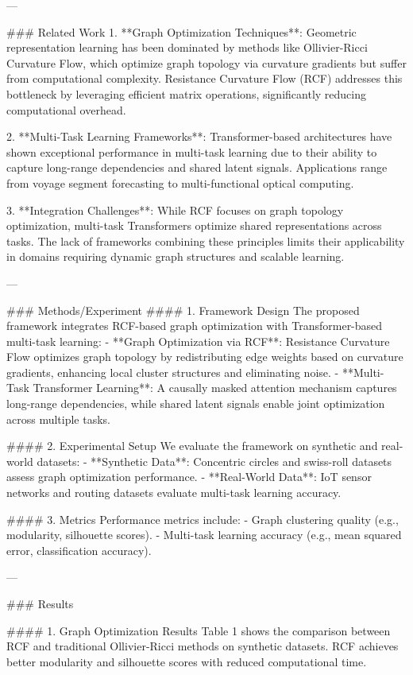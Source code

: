 ---

### Related Work
1. **Graph Optimization Techniques**: Geometric representation learning has been dominated by methods like Ollivier-Ricci Curvature Flow, which optimize graph topology via curvature gradients but suffer from computational complexity. Resistance Curvature Flow (RCF) addresses this bottleneck by leveraging efficient matrix operations, significantly reducing computational overhead.

2. **Multi-Task Learning Frameworks**: Transformer-based architectures have shown exceptional performance in multi-task learning due to their ability to capture long-range dependencies and shared latent signals. Applications range from voyage segment forecasting to multi-functional optical computing.

3. **Integration Challenges**: While RCF focuses on graph topology optimization, multi-task Transformers optimize shared representations across tasks. The lack of frameworks combining these principles limits their applicability in domains requiring dynamic graph structures and scalable learning.

---

### Methods/Experiment
#### 1. Framework Design
The proposed framework integrates RCF-based graph optimization with Transformer-based multi-task learning:
- **Graph Optimization via RCF**: Resistance Curvature Flow optimizes graph topology by redistributing edge weights based on curvature gradients, enhancing local cluster structures and eliminating noise.
- **Multi-Task Transformer Learning**: A causally masked attention mechanism captures long-range dependencies, while shared latent signals enable joint optimization across multiple tasks.

#### 2. Experimental Setup
We evaluate the framework on synthetic and real-world datasets:
- **Synthetic Data**: Concentric circles and swiss-roll datasets assess graph optimization performance.
- **Real-World Data**: IoT sensor networks and routing datasets evaluate multi-task learning accuracy.

#### 3. Metrics
Performance metrics include:
- Graph clustering quality (e.g., modularity, silhouette scores).
- Multi-task learning accuracy (e.g., mean squared error, classification accuracy).

---

### Results

#### 1. Graph Optimization Results
Table 1 shows the comparison between RCF and traditional Ollivier-Ricci methods on synthetic datasets. RCF achieves better modularity and silhouette scores with reduced computational time.

